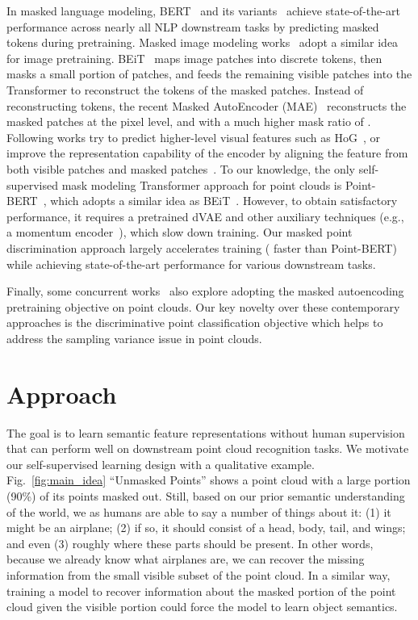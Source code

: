 \documentclass[runningheads]{llncs}
\begin{document}
In masked language modeling, BERT~\cite{devlin-etal-2019-bert} and its variants~\cite{joshi2020spanbert,Lan2020ALBERT} achieve state-of-the-art performance across nearly all NLP downstream tasks by predicting masked tokens during pretraining.  Masked image modeling works~\cite{bao2021beit,mae} adopt a similar idea 
for image pretraining. BEiT~\cite{bao2021beit} maps image patches into discrete tokens, then masks a small portion of patches, and feeds the remaining visible patches into the Transformer to reconstruct the tokens of the masked patches. Instead of reconstructing tokens, the recent Masked AutoEncoder (MAE)~\cite{mae} reconstructs the masked patches at the pixel level, and with a much higher mask ratio of . Following works try to predict higher-level visual features such as HoG~\cite{wei2021masked}, or improve the representation capability of the encoder by aligning the feature from both visible patches and masked patches~\cite{chen2022context}. To our knowledge, the only self-supervised mask modeling Transformer approach for point clouds is Point-BERT~\cite{yu2021point}, which adopts a similar idea as BEiT~\cite{bao2021beit}. However, to obtain satisfactory performance, it requires a pretrained dVAE and other auxiliary techniques (e.g., a momentum encoder~\cite{he2020momentum}), which slow down training.  Our masked point discrimination approach largely accelerates training (\textbf{} faster than Point-BERT) while achieving state-of-the-art performance for various downstream tasks.

Finally, some concurrent works~\cite{pang2022masked} also explore adopting the masked autoencoding pretraining objective on point clouds. Our key novelty over these contemporary approaches is the discriminative point classification objective which helps to address the sampling variance issue in point clouds.
 \section{Approach}

The goal is to learn semantic feature representations without human supervision that can perform well on downstream point cloud recognition tasks.
We motivate our self-supervised learning design with a qualitative example.  Fig.~\ref{fig:main_idea} ``Unmasked Points'' shows a point cloud with a large portion (90\%) of its points masked out.  Still, based on our prior semantic understanding of the world, we as humans are able to say a number of things about it: (1) it might be an airplane; (2) if so, it should consist of a head, body, tail, and wings; and even (3) roughly where these parts should be present.  In other words, because we already know what airplanes are, we can recover the missing information from the small visible subset of the point cloud.  In a similar way, training a model to recover information about the masked portion of the point cloud given the visible portion could force the model to learn object semantics.
\end{document}

